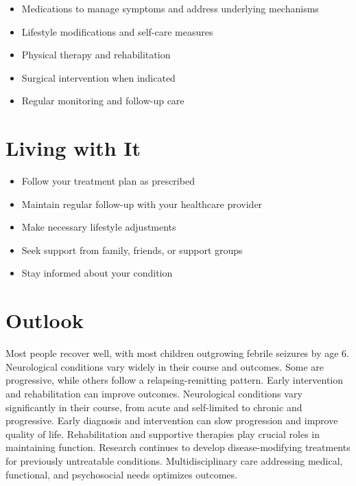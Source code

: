 \begin{itemize}[noitemsep]
  \item Medications to manage symptoms and address underlying mechanisms
  \item Lifestyle modifications and self-care measures
  \item Physical therapy and rehabilitation
  \item Surgical intervention when indicated
  \item Regular monitoring and follow-up care
\end{itemize}
\section{Living with It}
\begin{itemize}[noitemsep]
  \item Follow your treatment plan as prescribed
  \item Maintain regular follow-up with your healthcare provider
  \item Make necessary lifestyle adjustments
  \item Seek support from family, friends, or support groups
  \item Stay informed about your condition
\end{itemize}
\section{Outlook}
Most people recover well, with most children outgrowing febrile seizures by age 6. Neurological conditions vary widely in their course and outcomes. Some are progressive, while others follow a relapsing-remitting pattern. Early intervention and rehabilitation can improve outcomes. Neurological conditions vary significantly in their course, from acute and self-limited to chronic and progressive. Early diagnosis and intervention can slow progression and improve quality of life. Rehabilitation and supportive therapies play crucial roles in maintaining function. Research continues to develop disease-modifying treatments for previously untreatable conditions. Multidisciplinary care addressing medical, functional, and psychosocial needs optimizes outcomes.
